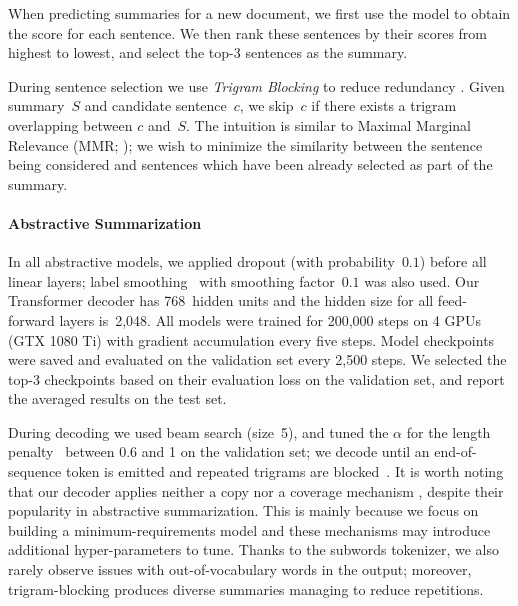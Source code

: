 \documentclass[11pt,a4paper]{article}
\begin{document}
    
    When predicting summaries for a new document, we first use the
    model to obtain the score for each sentence.  We then rank these
    sentences by their scores from highest to lowest, and select the
    top-3 sentences as the summary.
    
During sentence selection we use \textit{Trigram Blocking} to
    reduce redundancy \cite{paulus2017deep}.  Given summary~$S$ and
    candidate sentence~$c$, we skip~$c$ if there exists a trigram
    overlapping between $c$ and~$S$. The intuition is similar to
    Maximal Marginal Relevance (MMR; \citealt{carbonell1998use}); we
    wish to minimize the similarity between the sentence being
    considered and sentences which have been already selected as part
    of the summary.
    
    \paragraph{Abstractive Summarization}
    In all abstractive models, we applied dropout (with
    probability~$0.1$) before all linear layers; label
    smoothing~\citep{szegedy2016rethinking} with smoothing
    factor~$0.1$ was also used.  Our Transformer decoder has
    768~hidden units and the hidden size for all feed-forward layers
    is~2,048.  All models were trained for 200,000 steps on 4 GPUs
    (GTX 1080 Ti) with gradient accumulation every five steps.  Model
    checkpoints were saved and evaluated on the validation set every
    2,500 steps. We selected the top-3 checkpoints based on their
    evaluation loss on the validation set, and report the averaged
    results on the test set.
    
    During decoding we used beam search (size~5), and tuned the
    $\alpha$ for the length penalty~\citep{wu2016google} between $0.6$
    and 1 on the validation set; we decode until an end-of-sequence
    token is emitted and repeated trigrams are
    blocked~\cite{paulus2017deep}.  It is worth noting that our
    decoder applies neither a copy nor a coverage mechanism
    \cite{see-acl17}, despite their popularity in abstractive
    summarization. This is mainly because we focus on building a
    minimum-requirements model and these mechanisms may introduce
    additional hyper-parameters to tune.  Thanks to the subwords
    tokenizer, we also rarely observe issues with out-of-vocabulary
    words in the output; moreover, trigram-blocking produces diverse
    summaries managing to reduce repetitions. 
    
    
    
\end{document}
